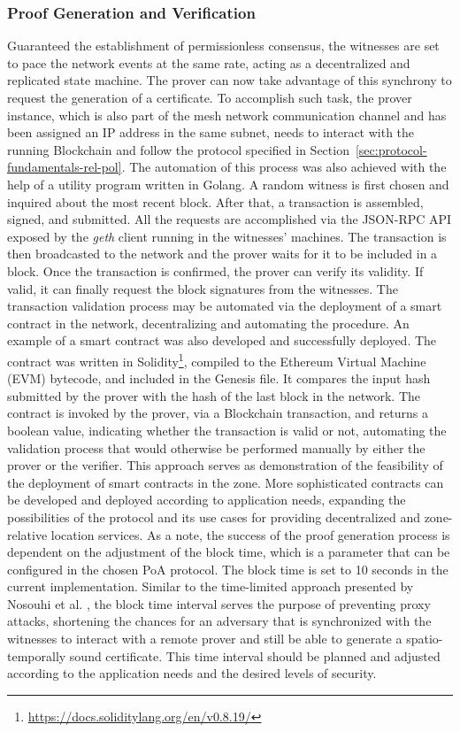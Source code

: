 \subsubsection{Proof Generation and Verification} \label{sec:pol-implementation:proof-generation-verification}

Guaranteed the establishment of permissionless consensus, the witnesses are set to pace the network events at the same rate, acting as a decentralized and replicated state machine. The prover can now take advantage of this synchrony to request the generation of a \pol{} certificate. To accomplish such task, the prover instance, which is also part of the mesh network communication channel and has been assigned an IP address in the same subnet, needs to interact with the running Blockchain and follow the protocol specified in Section~\ref{sec:protocol-fundamentals-rel-pol}. The automation of this process was also achieved with the help of a utility program written in Golang. A random witness is first chosen and inquired about the most recent block. After that, a transaction is assembled, signed, and submitted. All the requests are accomplished via the JSON-RPC API exposed by the \emph{geth} client running in the witnesses' machines. The transaction is then broadcasted to the network and the prover waits for it to be included in a block. Once the transaction is confirmed, the prover can verify its validity. If valid, it can finally request the block signatures from the witnesses. The transaction validation process may be automated via the deployment of a smart contract in the network, decentralizing and automating the procedure. An example of a smart contract was also developed and successfully deployed. The contract was written in Solidity\footnote{\url{https://docs.soliditylang.org/en/v0.8.19/}}, compiled to the Ethereum Virtual Machine (EVM) bytecode, and included in the Genesis file. It compares the input hash submitted by the prover with the hash of the last block in the network. The contract is invoked by the prover, via a Blockchain transaction, and returns a boolean value, indicating whether the transaction is valid or not, automating the validation process that would otherwise be performed manually by either the prover or the verifier. This approach serves as demonstration of the feasibility of the deployment of smart contracts in the zone. More sophisticated contracts can be developed and deployed according to application needs, expanding the possibilities of the protocol and its use cases for providing decentralized and zone-relative location services. As a note, the success of the proof generation process is dependent on the adjustment of the block time, which is a parameter that can be configured in the chosen PoA protocol. The block time is set to 10 seconds in the current implementation. Similar to the time-limited approach presented by Nosouhi et al. \cite{nosouhi2020blockchain}, the block time interval serves the purpose of preventing proxy attacks, shortening the chances for an adversary that is synchronized with the witnesses to interact with a remote prover and still be able to generate a spatio-temporally sound \pol{} certificate. This time interval should be planned and adjusted according to the application needs and the desired levels of security.

